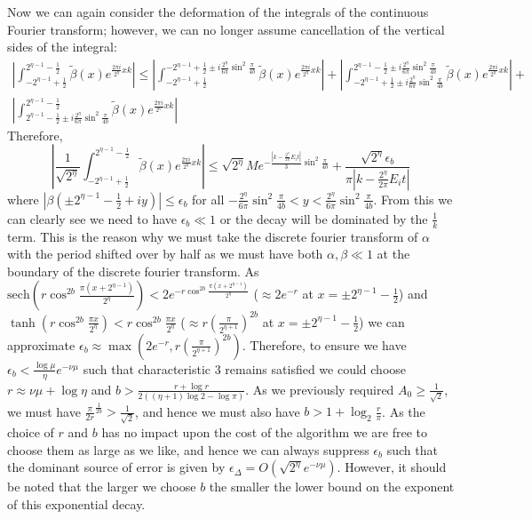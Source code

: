 \documentclass[aps,floatfix,10pt,amssymb,amsfont,amsmath,superscriptaddress,float,nofootinbib,longbibliography,nobalancelastpage,twocolumn]{revtex4-2}
\begin{document}
Now we can again consider the deformation of the integrals of the continuous Fourier transform; however, we can no longer assume cancellation of the vertical sides of the integral:
\begin{multline}
     \left|\int_{-2^{\eta-1}+\frac{1}{2}}^{2^{\eta-1}-\frac{1}{2}}\tilde\beta(x)e^{\frac{2\pi i}{2^{\eta}}xk}\right| \leq \left|\int_{-2^{\eta-1}+\frac{1}{2}}^{-2^{\eta-1}+\frac{1}{2}\pm i\frac{2^{\eta}}{6\pi}\sin^2\frac{\pi}{4b}}\tilde\beta(x)e^{\frac{2\pi i}{2^{\eta}}xk}\right|+\left|\int_{-2^{\eta-1}+\frac{1}{2}\pm i\frac{2^{\eta}}{6\pi}\sin^2\frac{\pi}{4b}}^{2^{\eta-1}-\frac{1}{2}\pm i\frac{2^{\eta}}{6\pi}\sin^2\frac{\pi}{4b}}\tilde\beta(x)e^{\frac{2\pi i}{2^{\eta}}xk}\right|+\\\left|\int_{2^{\eta-1}-\frac{1}{2}\pm i \frac{2^{\eta}}{6\pi}\sin^2\frac{\pi}{4b}}^{2^{\eta-1}-\frac{1}{2}}\tilde\beta(x)e^{\frac{2\pi i}{2^{\eta}}xk}\right|
\end{multline}
Therefore,
\begin{equation}
    \left|\frac{1}{\sqrt{2^{\eta}}}\int_{-2^{\eta-1}+\frac{1}{2}}^{2^{\eta-1}-\frac{1}{2}}\tilde\beta(x)e^{\frac{2\pi i}{2^{\eta}}xk}\right| \leq \sqrt{2^{\eta}}Me^{-\frac{|k-\frac{2^{\eta}}{2\pi}E_i t|}{3}\sin^2 \frac{\pi}{4b}} + \frac{\sqrt{2^{\eta}}\epsilon_b}{\pi|k-\frac{2^{\eta}}{2\pi}E_i t|}
\end{equation}
where $|\beta(\pm2^{\eta-1}-\frac{1}{2}+iy)| \leq\epsilon_b$ for all $-\frac{2^{\eta}}{6\pi}\sin^2\frac{\pi}{4b}<y<\frac{2^{\eta}}{6\pi}\sin^2\frac{\pi}{4b}$. From this we can clearly see we need to have $\epsilon_b \ll 1$ or the decay will be dominated by the $\frac{1}{k}$ term. This is the reason why we must take the discrete fourier transform of $\alpha$ with the period shifted over by half as we must have both $\alpha, \beta \ll 1$ at the boundary of the discrete fourier transform. As $\text{sech}( r\cos^{2b} \frac{\pi (x+2^{\eta-1})}{2^{\eta}})< 2e^{-r\cos^{2b} \frac{\pi (x+2^{\eta-1})}{2^{\eta}}}$ ($\approx 2e^{-r}$ at $x=\pm2^{\eta-1}-\frac{1}{2}$) and $\tanh (r\cos^{2b} \frac{\pi x}{2^{\eta}}) < r\cos^{2b} \frac{\pi x}{2^{\eta}}$ ($\approx r (\frac{\pi}{2^{\eta+1}})^{2b}$ at $x=\pm2^{\eta-1}-\frac{1}{2}$) we can approximate $\epsilon_b \approx \max(2e^{-r},r (\frac{\pi}{2^{\eta+1}})^{2b})$. Therefore, to ensure we have $\epsilon_b < \frac{\log\mu }{\eta}e^{-\nu\mu}$ such that characteristic 3 remains satisfied we could choose  $r\approx \nu\mu+\log \eta$ and $b > \frac{r+\log r}{2((\eta+1)\log 2 - \log \pi)}$. As we previously required $A_0 \geq \frac{1}{\sqrt{2}}$, we must have $\frac{\pi}{2r}^{\frac{1}{2b}} > \frac{1}{\sqrt{2}}$, and hence we must also have $b > 1 + \log_2 \frac{r}{\pi}$. As the choice of $r$ and $b$ has no impact upon the cost of the algorithm we are free to choose them as large as we like, and hence we can always suppress $\epsilon_b$ such that the dominant source of error is given by $\epsilon_{\Delta} = O(\sqrt{2^{\eta}}e^{-\nu\mu})$. However, it should be noted that the larger we choose $b$ the smaller the lower bound on the exponent of this exponential decay.
\end{document}
